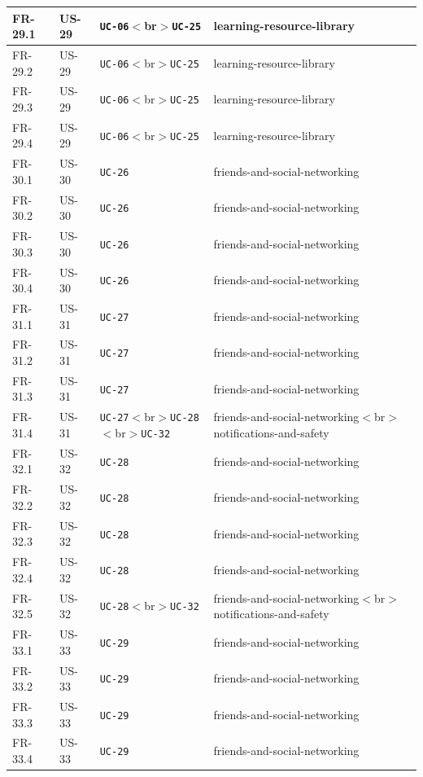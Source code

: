 \documentclass[12pt]{article}
\begin{document}
\begin{longtable}{|>{\raggedright\arraybackslash}p{}|>{\raggedright\arraybackslash}p{}|>{\raggedright\arraybackslash}p{}|>{\raggedright\arraybackslash}p{}|}
FR-29.1 & US-29 & \texttt{UC-06}$<$br$>$\texttt{UC-25} & learning-resource-library \\ \hline
FR-29.2 & US-29 & \texttt{UC-06}$<$br$>$\texttt{UC-25} & learning-resource-library \\ \hline
FR-29.3 & US-29 & \texttt{UC-06}$<$br$>$\texttt{UC-25} & learning-resource-library \\ \hline
FR-29.4 & US-29 & \texttt{UC-06}$<$br$>$\texttt{UC-25} & learning-resource-library \\ \hline
FR-30.1 & US-30 & \texttt{UC-26} & friends-and-social-networking \\ \hline
FR-30.2 & US-30 & \texttt{UC-26} & friends-and-social-networking \\ \hline
FR-30.3 & US-30 & \texttt{UC-26} & friends-and-social-networking \\ \hline
FR-30.4 & US-30 & \texttt{UC-26} & friends-and-social-networking \\ \hline
FR-31.1 & US-31 & \texttt{UC-27} & friends-and-social-networking \\ \hline
FR-31.2 & US-31 & \texttt{UC-27} & friends-and-social-networking \\ \hline
FR-31.3 & US-31 & \texttt{UC-27} & friends-and-social-networking \\ \hline
FR-31.4 & US-31 & \texttt{UC-27}$<$br$>$\texttt{UC-28}$<$br$>$\texttt{UC-32} & friends-and-social-networking$<$br$>$notifications-and-safety \\ \hline
FR-32.1 & US-32 & \texttt{UC-28} & friends-and-social-networking \\ \hline
FR-32.2 & US-32 & \texttt{UC-28} & friends-and-social-networking \\ \hline
FR-32.3 & US-32 & \texttt{UC-28} & friends-and-social-networking \\ \hline
FR-32.4 & US-32 & \texttt{UC-28} & friends-and-social-networking \\ \hline
FR-32.5 & US-32 & \texttt{UC-28}$<$br$>$\texttt{UC-32} & friends-and-social-networking$<$br$>$notifications-and-safety \\ \hline
FR-33.1 & US-33 & \texttt{UC-29} & friends-and-social-networking \\ \hline
FR-33.2 & US-33 & \texttt{UC-29} & friends-and-social-networking \\ \hline
FR-33.3 & US-33 & \texttt{UC-29} & friends-and-social-networking \\ \hline
FR-33.4 & US-33 & \texttt{UC-29} & friends-and-social-networking \\ \hline

\end{longtable}
\end{document}
